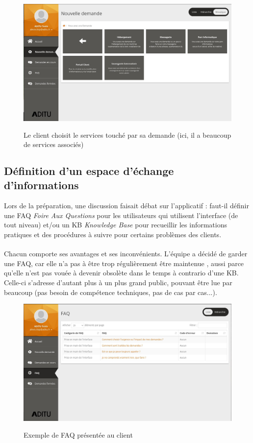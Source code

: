 \begin{figure}[H]
    \centering
    \includegraphics[width=\textwidth - \textwidth / 10]{ressources/images-itop/02.jpg}
    \figurename
    \caption{Le client choisit le services touché par sa demande (ici, il a beaucoup de services associés)}
    \label{fig:02-itop}
\end{figure}

\subsection{Définition d'un espace d'échange d'informations}

Lors de la préparation, une discussion faisait débat sur l'applicatif : faut-il définir une FAQ \textit{Foire Aux Questions} pour les utilisateurs qui utilisent l'interface (de tout niveau) et/ou un KB \textit{Knowledge Base} pour recueillir les informations pratiques et des procédures à suivre pour certains problèmes des clients.
\\ \\
Chacun comporte ses avantages et ses inconvénients. L'équipe a décidé de garder une FAQ, car elle n'a pas à être trop régulièrement être maintenue , aussi parce qu'elle n'est pas vouée à devenir obsolète dans le temps à contrario d'une KB. Celle-ci s'adresse d'autant plus à un plus grand public, pouvant être lue par beaucoup (pas besoin de compétence techniques, pas de cas par cas...).

\begin{figure}[H]
    \centering
    \includegraphics[width=\textwidth - \textwidth / 10]{ressources/images-itop/03.jpg}
    \figurename
    \caption{Exemple de FAQ présentée au client}
    \label{fig:03-itop}
\end{figure}

